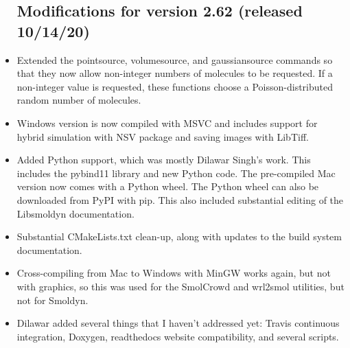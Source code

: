 \documentclass {scrbook}
\begin{document}
\begin{itemize}
\subsection{Modifications for version 2.62 (released 10/14/20)}
\item Extended the pointsource, volumesource, and gaussiansource commands so that they now allow non-integer numbers of molecules to be requested. If a non-integer value is requested, these functions choose a Poisson-distributed random number of molecules.
\item Windows version is now compiled with MSVC and includes support for hybrid simulation with NSV package and saving images with LibTiff.
\item Added Python support, which was mostly Dilawar Singh's work. This includes the pybind11 library and new Python code. The pre-compiled Mac version now comes with a Python wheel. The Python wheel can also be downloaded from PyPI with pip. This also included substantial editing of the Libsmoldyn documentation.
\item Substantial CMakeLists.txt clean-up, along with updates to the build system documentation.
\item Cross-compiling from Mac to Windows with MinGW works again, but not with graphics, so this was used for the SmolCrowd and wrl2smol utilities, but not for Smoldyn.
\item Dilawar added several things that I haven't addressed yet: Travis continuous integration, Doxygen, readthedocs website compatibility, and several scripts.


\end{itemize}
\end{document}

